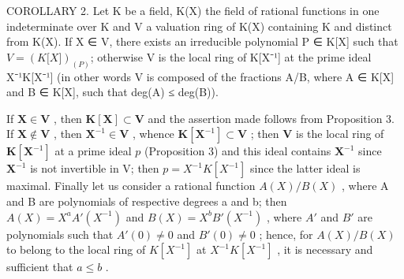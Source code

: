 COROLLARY 2. Let K be a field, K(X) the field of rational functions in one indeterminate over K and V a valuation ring of K(X) containing K and distinct from K(X). If X ∈ V, there exists an irreducible polynomial P ∈ K{[}X{]} such that \(V = (K{[}X{]})_{(P)}\); otherwise V is the local ring of K{[}X⁻¹{]} at the prime ideal X⁻¹K{[}X⁻¹{]} (in other words V is composed of the fractions A/B, where A ∈ K{[}X{]} and B ∈ K{[}X{]}, such that deg(A) ≤ deg(B)).

If \(\mathbf{X} \in \mathbf{V}\) , then \(\mathbf{K}[\mathbf{X}] \subset \mathbf{V}\) and the assertion made follows from Proposition 3. If \(\mathbf{X} \notin \mathbf{V}\) , then \(\mathbf{X}^{-1} \in \mathbf{V}\) , whence \(\mathbf{K}[\mathbf{X}^{-1}] \subset \mathbf{V}\) ; then \(\mathbf{V}\) is the local ring of \(\mathbf{K}[\mathbf{X}^{-1}]\) at a prime ideal \(p\) (Proposition 3) and this ideal contains \(\mathbf{X}^{-1}\) since \(\mathbf{X}^{-1}\) is not invertible in V; then \(p = X^{-1}K[X^{-1}]\) since the latter ideal is maximal. Finally let us consider a rational function \(A(X)/B(X)\) , where A and B are polynomials of respective degrees a and b; then \(A(X) = X^{a}A'(X^{-1})\) and \(B(X) = X^{b}B'(X^{-1})\) , where \(A'\) and \(B'\) are polynomials such that \(A'(0) \neq 0\) and \(B'(0) \neq 0\) ; hence, for \(A(X)/B(X)\) to belong to the local ring of \(K[X^{-1}]\) at \(X^{-1}K[X^{-1}]\) , it is necessary and sufficient that \(a \leqslant b\) .

